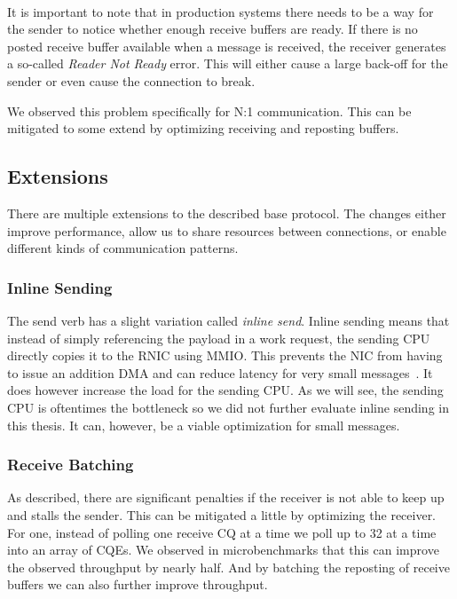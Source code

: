 \paragraph{} It is important to note that in production systems there needs to be a way for the sender to notice whether 
enough receive buffers are ready. If there is no posted receive buffer available when a message is received, the receiver  generates
a so-called \emph{Reader Not Ready} error. This will either cause a large back-off for the sender or even cause the connection
to break.

We observed this problem specifically for N:1 communication. This can be mitigated to some extend by optimizing receiving and
reposting buffers.




\subsection{Extensions}

There are multiple extensions to the described base protocol. The changes either improve performance, allow us to
share resources between connections, or enable different kinds of communication patterns.

\subsubsection{Inline Sending}
The send verb has a slight variation called \emph{inline send}. Inline sending means that instead of 
simply referencing the payload in a work request, the sending CPU directly copies it to the RNIC using MMIO. This prevents
the NIC from having to issue an addition DMA and can reduce latency for very small messages~\cite{anuj-guide}. It does however
increase the load for the sending CPU. As we will see, the sending CPU is oftentimes the bottleneck so we did not further 
evaluate inline sending in this thesis. It can, however, be a viable optimization for small messages.


\subsubsection{Receive Batching} 
As described, there are significant penalties if the receiver is not able to keep up and stalls the sender.
This can be mitigated a little by optimizing the receiver. For one, instead of polling one receive CQ at a time we poll up to 32
at a time into an array of CQEs. We observed in microbenchmarks that this can improve the observed throughput by nearly half.
And by batching the reposting of receive buffers we can also further improve throughput.

